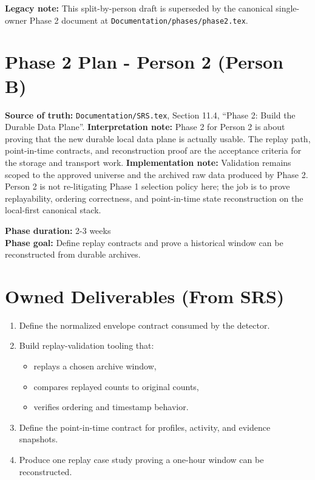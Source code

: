 \documentclass{article}
\begin{document}
\textbf{Legacy note:} This split-by-person draft is superseded by the canonical single-owner Phase 2 document at \texttt{Documentation/phases/phase2.tex}.\\

\section*{Phase 2 Plan - Person 2 (Person B)}

\textbf{Source of truth:} \texttt{Documentation/SRS.tex}, Section 11.4, ``Phase 2: Build the Durable Data Plane''.
\textbf{Interpretation note:} Phase 2 for Person 2 is about proving that the new durable local data plane is actually usable. The replay path, point-in-time contracts, and reconstruction proof are the acceptance criteria for the storage and transport work.
\textbf{Implementation note:} Validation remains scoped to the approved universe and the archived raw data produced by Phase 2. Person 2 is not re-litigating Phase 1 selection policy here; the job is to prove replayability, ordering correctness, and point-in-time state reconstruction on the local-first canonical stack.

\textbf{Phase duration:} 2-3 weeks\\
\textbf{Phase goal:} Define replay contracts and prove a historical window can be reconstructed from durable archives.

\section*{Owned Deliverables (From SRS)}
\begin{enumerate}
\item Define the normalized envelope contract consumed by the detector.
\item Build replay-validation tooling that:
\begin{itemize}
\item replays a chosen archive window,
\item compares replayed counts to original counts,
\item verifies ordering and timestamp behavior.
\end{itemize}
\item Define the point-in-time contract for profiles, activity, and evidence snapshots.
\item Produce one replay case study proving a one-hour window can be reconstructed.
\end{enumerate}
\end{document}
